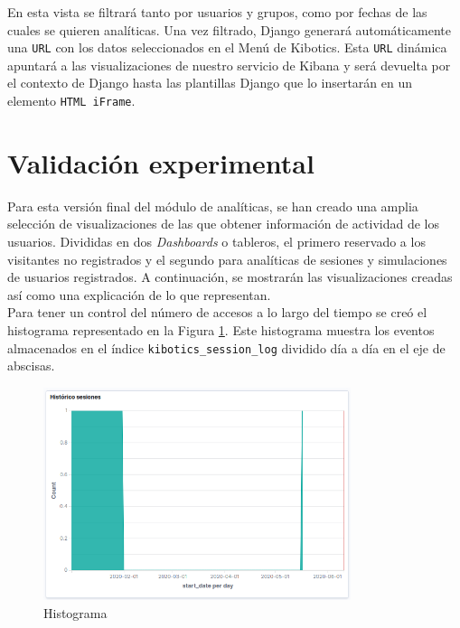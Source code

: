 \documentclass[a4paper, 12pt]{book}
\begin{document}
		En esta vista se filtrará tanto por usuarios y grupos, como por fechas de las cuales se quieren analíticas. Una vez filtrado, Django generará automáticamente una \texttt{URL} con los datos seleccionados en el Menú de Kibotics. Esta \texttt{URL} dinámica apuntará a las visualizaciones de nuestro servicio de Kibana y será devuelta por el contexto de Django hasta las plantillas Django que lo insertarán en un elemento \texttt{HTML iFrame}.
	

	\section{Validación experimental} 
	\label{sec:2_validacion_experimental} 


		Para esta versión final del módulo de analíticas, se han creado una amplia selección de visualizaciones de las que obtener información de actividad de los usuarios. Divididas en dos \textit{Dashboards} o tableros, el primero reservado a los visitantes no registrados y el segundo para analíticas de sesiones y simulaciones de usuarios registrados. A continuación, se mostrarán las visualizaciones creadas así como una explicación de lo que representan.\\
		
		Para tener un control del número de accesos a lo largo del tiempo se creó el histograma representado en la Figura \ref{fig:kibana_histogram}. Este histograma muestra los eventos almacenados en el índice \texttt{kibotics\_session\_log} dividido día a día en el eje de abscisas.	
		\begin{figure}[H]
			\centering
			\includegraphics[width=9cm, keepaspectratio]{img/kibana_01_histogram}
			\caption{Histograma}
			\label{fig:kibana_histogram}
		\end{figure}
		
\end{document}
